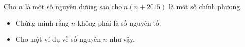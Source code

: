 \ifshowproblem
\begin{problem}\label{example:FRA-2015-TST1-P3}
	Cho \( n \) là một số nguyên dương sao cho \( n(n + 2015) \) là một số chính phương.
    \begin{itemize}[topsep=0pt, partopsep=0pt, itemsep=0pt]
        \item Chứng minh rằng \( n \) không phải là số nguyên tố.
        \item Cho một ví dụ về số nguyên \( n \) như vậy.
    \end{itemize}
\end{problem}
\fi

\footnotemark
{}
\fi